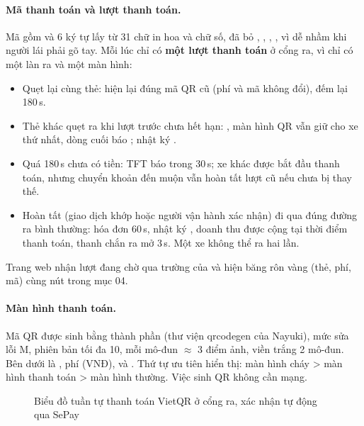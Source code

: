 \paragraph{Mã thanh toán và lượt thanh toán.} Mã gồm  và 6 ký tự lấy từ 31 chữ in hoa
và chữ số, đã bỏ , , , ,  vì dễ nhầm khi người lái
phải gõ tay. Mỗi lúc chỉ có \textbf{một lượt thanh
toán} ở cổng ra, vì chỉ có một làn ra và một màn hình:
\begin{itemize}[nosep]
  \item Quẹt lại cùng thẻ: hiện lại đúng mã QR cũ (phí và mã không đổi), đếm lại 180\,s.
  \item Thẻ khác quẹt ra khi lượt trước chưa hết hạn: ,
        màn hình QR vẫn giữ cho xe thứ nhất, dòng cuối báo ; nhật ký .
  \item Quá 180\,s chưa có tiền: TFT báo  trong 30\,s; xe khác được bắt đầu thanh toán, nhưng chuyển khoản đến
        muộn vẫn hoàn tất lượt cũ nếu chưa bị thay thế.
  \item Hoàn tất (giao dịch khớp hoặc người vận hành xác nhận) đi qua đúng đường ra bình
        thường: hóa đơn 60\,s, nhật ký , doanh thu được cộng tại thời điểm thanh
        toán, thanh chắn ra mở 3\,s. Một xe không thể ra hai lần.
\end{itemize}
Trang web nhận lượt đang chờ qua trường  của  và hiện băng
rôn vàng  (thẻ, phí, mã) cùng nút  trong mục 04.

\paragraph{Màn hình thanh toán.} Mã QR được sinh bằng thành phần 
(thư viện qrcodegen của Nayuki), mức sửa lỗi M, phiên bản tối đa 10, mỗi mô-đun
$\approx$ 3 điểm ảnh, viền trắng 2 mô-đun. Bên dưới là , phí (VNĐ),
 và . Thứ tự ưu tiên hiển thị:
màn hình cháy > màn hình thanh toán > màn hình thường. Việc sinh QR không cần mạng.

\begin{figure}[H]
\centering
{}
\caption{Biểu đồ tuần tự thanh toán VietQR ở cổng ra, xác nhận tự động qua SePay}\label{fig:seq-pay}
\end{figure}

